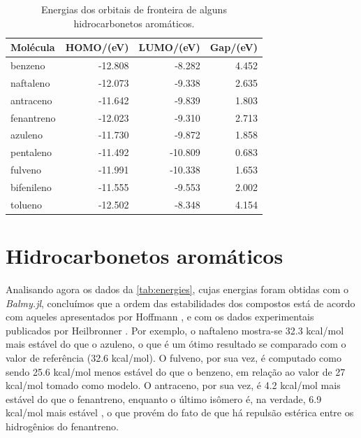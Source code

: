 \begin{table}[htb]
	\centering
	\caption{\label{tab:gapsO} Energias dos orbitais de fronteira de alguns hidrocarbonetos aromáticos.}	
	\begin{tabular}{lrrr}
		\toprule
		\textbf{Molécula} & \textbf{HOMO/(eV)} & \textbf{LUMO/(eV)} & \textbf{Gap/(eV)}
		\\ 
		\midrule
        benzeno & -12.808 & -8.282 & 4.452 \\
        naftaleno & -12.073 & -9.338 & 2.635 \\
        antraceno & -11.642 & -9.839 & 1.803 \\
        fenantreno & -12.023 & -9.310 & 2.713 \\
        azuleno & -11.730 & -9.872 & 1.858 \\
        pentaleno & -11.492 & -10.809 & 0.683 \\
        fulveno & -11.991 & -10.338 & 1.653 \\
        bifenileno & -11.555 & -9.553 & 2.002 \\
        tolueno & -12.502 & -8.348 & 4.154 \\
    \bottomrule
	\end{tabular}
\end{table}

\section{Hidrocarbonetos aromáticos}

Analisando agora os dados da \autoref{tab:energies}, cujas energias foram obtidas com o \textit{Balmy.jl}, concluímos que a ordem das estabilidades dos compostos está de acordo com aqueles apresentados por Hoffmann \autocite{Hoffmann1963}, e com os dados experimentais publicados por Heilbronner \autocite{ginsburg1959}. Por exemplo, o naftaleno mostra-se 32.3 kcal/mol mais estável do que o azuleno, o que é um ótimo resultado se comparado com o valor de referência (32.6 kcal/mol)\autocite{ginsburg1959}. O fulveno, por sua vez, é computado como sendo 25.6 kcal/mol menos estável do que o benzeno, em relação ao valor de 27 kcal/mol tomado como modelo\autocite{CHENG1956}. O antraceno, por sua vez, é 4.2 kcal/mol mais estável do que o fenantreno, enquanto o último isômero é, na verdade, 6.9 kcal/mol mais estável \autocite{Hoffmann1963}, o que provém do fato de que há repulsão estérica entre os hidrogênios do fenantreno.


